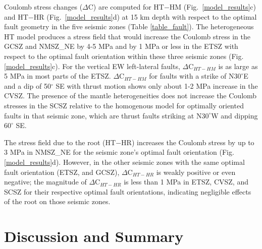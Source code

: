 \documentclass[draft,linenumbers]{agujournal2018}
\begin{document}
Coulomb stress changes ($\Delta $C) are computed for HT$-$HM (Fig.~\ref{model_results}c) and HT$-$HR (Fig.~\ref{model_results}d) at 15 km depth with respect to the optimal fault geometry in the five seismic zones (Table \ref{table_fault}). 
The heterogeneous HT model produces a stress field that would increase the Coulomb stress in the GCSZ and  NMSZ\_NE by 4-5 MPa and by 1 MPa or less in the ETSZ with respect to the optimal fault orientation within these three seismic zones (Fig. \ref{model_results}c). For the vertical EW left-lateral faults, $\Delta$C$_{HT-HM}$ is as large as 5 MPa in most parts of the ETSZ. $\Delta$C$_{HT-HM}$ for faults with a strike of N$30^\circ$E and a dip of 50$^\circ$ SE with thrust motion shows only about 1-2 MPa increase in the CVSZ. The presence of the mantle heterogeneities does not increase the Coulomb stresses in the SCSZ relative to the homogenous model for optimally oriented faults in that seismic zone, which are thrust faults striking at N$30^\circ$W and dipping $60^\circ$ SE. %

The stress field due to the root (HT$-$HR) increases the Coulomb stress by up to 3 MPa in NMSZ\_NE for the seismic zone's optimal fault orientation (Fig. \ref{model_results}d). However, in the other seismic zones with the same optimal fault orientation (ETSZ, and GCSZ), $\Delta $C$_{HT-HR}$ is weakly positive or even negative; the magnitude of $\Delta $C$_{HT-HR}$ is less than 1 MPa in ETSZ, CVSZ, and SCSZ for their respective optimal fault orientations, indicating negligible effects of the root on those seismic zones. 
    
\section{Discussion and Summary}
    
\end{document}
